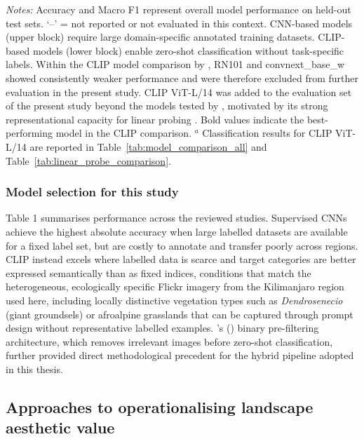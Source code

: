 \documentclass[hidelinks, 11pt]{article}
\begin{document}
\begin{table}[ht]
\begin{minipage}{\textwidth}
\textit{Notes:} Accuracy and Macro F1 represent overall model performance on held-out test sets. `--' = not reported or not evaluated in this context. CNN-based models (upper block) require large domain-specific annotated training datasets. CLIP-based models (lower block) enable zero-shot classification without task-specific labels. Within the CLIP model 
comparison by \citet{liao_mapping_2025}, RN101 and convnext\_base\_w showed consistently weaker performance and were therefore excluded from 
further evaluation in the present study. CLIP ViT-L/14 was added to the evaluation set of the present study beyond the models tested by \citet{liao_mapping_2025}, motivated by its strong representational capacity for linear probing \citep{radford_learning_2021}. Bold values indicate the best-performing model in the CLIP comparison. $^{a}$ Classification results for CLIP ViT-L/14 are reported in Table~\ref{tab:model_comparison_all} and 
Table~\ref{tab:linear_probe_comparison}.
\end{minipage}
\end{table}

\subsubsection{Model selection for this study}
Table 1 summarises performance across the reviewed studies. Supervised CNNs achieve the highest absolute accuracy when large labelled datasets are available for a fixed label set, but are costly to annotate and transfer poorly across regions. CLIP instead excels where labelled data is scarce and target categories are better expressed semantically than as fixed indices, conditions that match the heterogeneous, ecologically specific Flickr imagery from the Kilimanjaro region used here, including locally distinctive vegetation types such as \textit{Dendrosenecio} (giant groundsels) or afroalpine grasslands that can be captured through prompt design without representative labelled examples. \citeauthor{liao_mapping_2025}'s (\citeyear{liao_mapping_2025}) binary pre-filtering architecture, which removes irrelevant images before zero-shot classification, further provided direct methodological precedent for the hybrid pipeline adopted in this thesis.



\subsection{Approaches to operationalising landscape aesthetic value}
\end{document}
